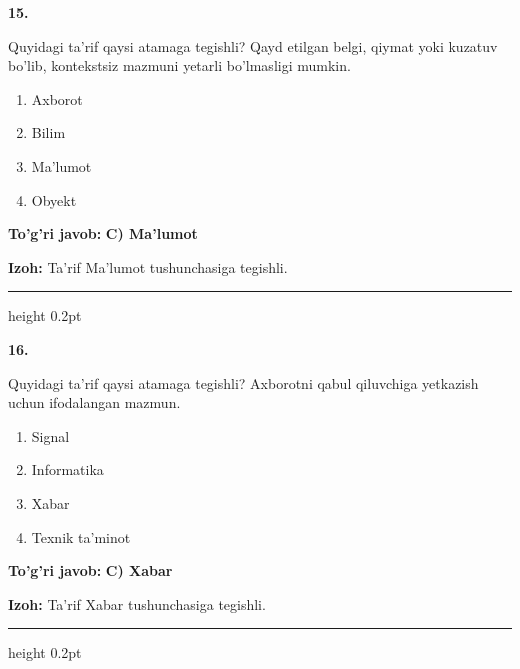 \documentclass[10pt,a4paper,oneside]{article}
\begin{document}
\noindent\textbf{\color{ink}15.}
\par
Quyidagi ta'rif qaysi atamaga tegishli? Qayd etilgan belgi, qiymat yoki kuzatuv bo'lib, kontekstsiz mazmuni yetarli bo'lmasligi mumkin.
\begin{enumerate}[label=\Alph*),leftmargin=9mm]
\item Axborot
\item Bilim
\item Ma'lumot
\item Obyekt
\end{enumerate}
\begin{tcolorbox}[enhanced,breakable,colback=teal!4,colframe=teal!50!black,boxrule=0.5pt,arc=1.1mm,left=3mm,right=3mm,top=1.7mm,bottom=1.7mm,before skip=2mm,after skip=2mm]
\textbf{\color{teal}To'g'ri javob:} \textbf{C) Ma'lumot}
\par\smallskip
\textbf{Izoh:} Ta'rif Ma'lumot tushunchasiga tegishli.
\end{tcolorbox}
\vspace{2mm}\hrule height 0.2pt \vspace{3mm}

\noindent\textbf{\color{ink}16.}
\par
Quyidagi ta'rif qaysi atamaga tegishli? Axborotni qabul qiluvchiga yetkazish uchun ifodalangan mazmun.
\begin{enumerate}[label=\Alph*),leftmargin=9mm]
\item Signal
\item Informatika
\item Xabar
\item Texnik ta'minot
\end{enumerate}
\begin{tcolorbox}[enhanced,breakable,colback=teal!4,colframe=teal!50!black,boxrule=0.5pt,arc=1.1mm,left=3mm,right=3mm,top=1.7mm,bottom=1.7mm,before skip=2mm,after skip=2mm]
\textbf{\color{teal}To'g'ri javob:} \textbf{C) Xabar}
\par\smallskip
\textbf{Izoh:} Ta'rif Xabar tushunchasiga tegishli.
\end{tcolorbox}
\vspace{2mm}\hrule height 0.2pt \vspace{3mm}
\end{document}
